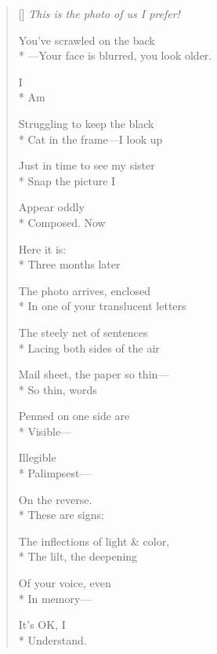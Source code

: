 \label{ch:letter}
\settowidth{\versewidth}{In one of your translucent letters}
\begin{verse}[\versewidth]
\textit{This is the photo of us I prefer!}

You've scrawled on the back\\*
---Your face is blurred, you look older.    

\hspace*{3\vgap} I\\*
Am

Struggling to keep the black\\*
Cat in the frame---I look up

Just in time to see my sister\\*
Snap \qquad the picture \qquad I

Appear oddly\\*
Composed. \qquad Now

Here it is:\\*
Three months later

The photo arrives, enclosed\\*
In one of your translucent letters

The steely net of sentences\\*
Lacing both sides of the air

Mail sheet, the paper so thin---\\*
So thin, words

Penned on one side are\\*
Visible---

Illegible\\*
Palimpsest---

On the reverse.\\*
These are signs:

The inflections of light \& color,\\*
The lilt, the deepening

Of your voice, even\\*
In memory---

It's OK, I\\*
Understand.
\end{verse}
